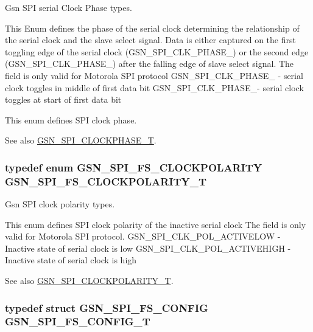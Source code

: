 Gsn SPI serial Clock Phase types. 

This Enum defines the phase of the serial clock determining the relationship of the serial clock and the slave select signal. Data is either captured on the first toggling edge of the serial clock (GSN\_\-SPI\_\-CLK\_\-PHASE\_) or the second edge (GSN\_\-SPI\_\-CLK\_\-PHASE\_) after the falling edge of slave select signal. The field is only valid for Motorola SPI protocol GSN\_\-SPI\_\-CLK\_\-PHASE\_ -\/ serial clock toggles in middle of first data bit GSN\_\-SPI\_\-CLK\_\-PHASE\_-\/ serial clock toggles at start of first data bit

This enum defines SPI clock phase. \begin{DoxySeeAlso}{See also}
\hyperlink{a00655_ga1399b803d30956e8ed6f4929033329ad}{GSN\_\-SPI\_\-CLOCKPHASE\_\-T}. 
\end{DoxySeeAlso}
\hypertarget{a00655_ga68952a1f7c2baa0ffb682a9689229eaf}{
\subsubsection[{GSN\_\-SPI\_\-FS\_\-CLOCKPOLARITY\_\-T}]{\setlength{\rightskip}{0pt plus 5cm}typedef enum {\bf GSN\_\-SPI\_\-FS\_\-CLOCKPOLARITY}  {\bf GSN\_\-SPI\_\-FS\_\-CLOCKPOLARITY\_\-T}}}
\label{a00655_ga68952a1f7c2baa0ffb682a9689229eaf}


Gsn SPI clock polarity types. 

This enum defines SPI clock polarity of the inactive serial clock The field is only valid for Motorola SPI protocol. GSN\_\-SPI\_\-CLK\_\-POL\_\-ACTIVELOW -\/ Inactive state of serial clock is low GSN\_\-SPI\_\-CLK\_\-POL\_\-ACTIVEHIGH -\/ Inactive state of serial clock is high

\begin{DoxySeeAlso}{See also}
\hyperlink{a00655_ga40c914db809ec79fd3a564dda8364aea}{GSN\_\-SPI\_\-CLOCKPOLARITY\_\-T}. 
\end{DoxySeeAlso}
\hypertarget{a00655_ga9f1e06e0752e4d0b2310b69b46111df9}{
\subsubsection[{GSN\_\-SPI\_\-FS\_\-CONFIG\_\-T}]{\setlength{\rightskip}{0pt plus 5cm}typedef struct {\bf GSN\_\-SPI\_\-FS\_\-CONFIG}  {\bf GSN\_\-SPI\_\-FS\_\-CONFIG\_\-T}}}
\label{a00655_ga9f1e06e0752e4d0b2310b69b46111df9}


